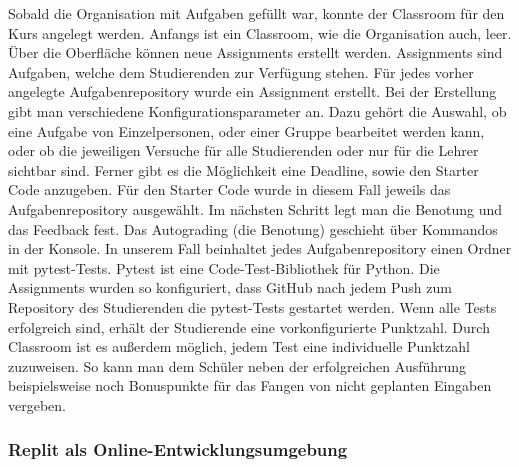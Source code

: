 Sobald die Organisation mit Aufgaben gefüllt war, konnte der
\glqq Classroom\grqq{} für den Kurs angelegt werden. Anfangs ist ein Classroom,
wie die Organisation auch, leer. Über die Oberfläche können neue Assignments
erstellt werden. Assignments sind Aufgaben, welche dem Studierenden zur
Verfügung stehen. Für jedes vorher angelegte Aufgabenrepository wurde ein
Assignment erstellt. Bei der Erstellung gibt man verschiedene
Konfigurationsparameter an. Dazu gehört die Auswahl, ob eine Aufgabe von
Einzelpersonen, oder einer Gruppe bearbeitet werden kann, oder ob die jeweiligen
Versuche für alle Studierenden oder nur für die Lehrer sichtbar sind. Ferner
gibt es die Möglichkeit eine Deadline, sowie den Starter Code anzugeben. Für den
Starter Code wurde in diesem Fall jeweils das Aufgabenrepository ausgewählt. Im
nächsten Schritt legt man die Benotung und das Feedback fest. Das Autograding
(die Benotung) geschieht über Kommandos in der Konsole. In unserem Fall
beinhaltet jedes Aufgabenrepository einen Ordner mit pytest-Tests. Pytest ist
eine Code-Test-Bibliothek für Python. Die Assignments wurden so konfiguriert,
dass GitHub nach jedem Push zum Repository des Studierenden die pytest-Tests
gestartet werden. Wenn alle Tests erfolgreich sind, erhält der Studierende eine
vorkonfigurierte Punktzahl. Durch Classroom ist es außerdem möglich, jedem
Test eine individuelle Punktzahl zuzuweisen. So kann man dem Schüler neben der erfolgreichen Ausführung beispielsweise noch Bonuspunkte für das Fangen von
nicht geplanten Eingaben vergeben.

\subsubsection{Replit als Online-Entwicklungsumgebung}